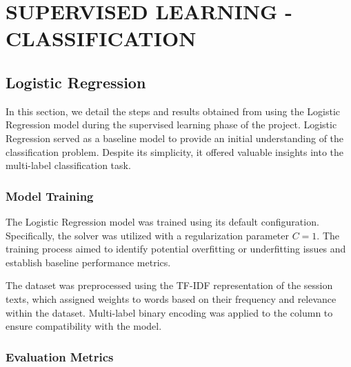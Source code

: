 
\section{SUPERVISED LEARNING - CLASSIFICATION}


    \subsection{Logistic Regression}

        In this section, we detail the steps and results obtained from using the Logistic Regression model during the supervised learning phase of the project. Logistic Regression served as a baseline model to provide an initial understanding of the classification problem. Despite its simplicity, it offered valuable insights into the multi-label classification task.

        \subsubsection{Model Training \\}

            The Logistic Regression model was trained using its default configuration. Specifically, the  solver was utilized with a regularization parameter \( C = 1 \). The training process aimed to identify potential overfitting or underfitting issues and establish baseline performance metrics.


            The dataset was preprocessed using the TF-IDF representation of the session texts, which assigned weights to words based on their frequency and relevance within the dataset. Multi-label binary encoding was applied to the  column to ensure compatibility with the model.

        \subsubsection{Evaluation Metrics \\}

